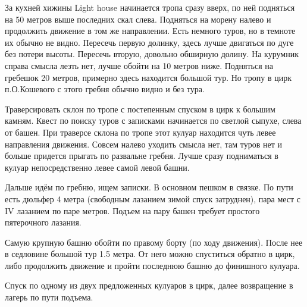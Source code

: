 За кухней хижины Light house начинается тропа сразу вверх, по ней
подняться на 50 метров выше последних скал слева. Подняться на морену
налево и продолжить движение в том же направлении. Есть немного туров,
но в темноте их обычно не видно. Пересечь первую долинку, здесь лучше
двигаться по дуге без потери высоты. Пересечь вторую, довольно
обширную долину. На курумник справа смысла лезть нет, лучше обойти на
10 метров ниже. Подняться на гребешок 20 метров, примерно здесь
находится большой тур. Но тропу в цирк п.О.Кошевого с этого гребня
обычно видно и без тура.

Траверсировать склон по тропе с постепенным спуском в цирк к большим
камням. Квест по поиску туров с записками начинается по светлой
сыпухе, слева от башен. При траверсе склона по тропе этот кулуар
находится чуть левее направления движения. Совсем налево уходить
смысла нет, там туров нет и больше придется прыгать по развальне
гребня. Лучше сразу подниматься в кулуар непосредственно левее самой
левой башни.

Дальше идём по гребню, ищем записки. В основном пешком в связке. По
пути есть дюльфер 4 метра (свободным лазанием зимой спуск затруднен),
пара мест с IV лазанием по паре метров. Подъем на пару башен требует
простого пятерочного лазания.

Самую крупную башню обойти по правому борту (по ходу движения). После
нее в седловине большой тур 1.5 метра. От него можно спуститься
обратно в цирк, либо продолжить движение и пройти последнюю башню до
финишного кулуара.

Спуск по одному из двух предложенных кулуаров в цирк, далее
возвращение в лагерь по пути подъема.
